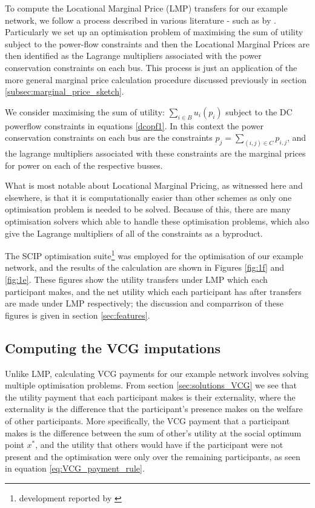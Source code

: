 To compute the Locational Marginal Price (LMP) transfers for our example network, we follow a process described in various literature - such as by \cite{lmp1,lmp2}.
Particularly we set up an optimisation problem of maximising the sum of utility subject to the power-flow constraints and then the Locational Marginal Prices are then identified as the Lagrange multipliers associated with the power conservation constraints on each bus.
This process is just an application of the more general marginal price calculation procedure discussed previously in section \ref{subsec:marginal_price_sketch}.

We consider maximising the sum of utility: $\sum_{i\in B} u_i(p_i)$ subject to the DC powerflow constraints in equations \ref{dcopf1}.
In this context the power conservation constraints on each bus are the constraints $p_j = \sum_{(i,j)\in C}p_{i,j}$, and the lagrange multipliers associated with these constraints are the marginal prices for power on each of the respective busses.

What is most notable about Locational Marginal Pricing, as witnessed here and elsewhere, is that it is computationally easier than other schemes as only one optimisation problem is needed to be solved.
Because of this, there are many optimisation solvers which able to handle these optimisation problems, which also give the Lagrange multipliers of all of the constraints as a byproduct.

The SCIP optimisation suite\footnote{development reported by \cite{MaherFischerGallyetal.2017}} was employed for the optimisation of our example network, and the results of the calculation are shown in Figures \ref{fig:1f} and \ref{fig:1e}.
These figures show the utility transfers under LMP which each participant makes, and the net utility which each participant has after transfers are made under LMP respectively; the discussion and comparrison of these figures is given in section \ref{sec:features}.

\subsection{Computing the VCG imputations}\label{subsec:VCG_compute1}

Unlike LMP, calculating VCG payments for our example network involves solving multiple optimisation problems.
From section \ref{sec:solutions_VCG} we see that the utility payment that each participant makes is their externality, where the externality is the difference that the participant's presence makes on the welfare of other participants.
More specifically, the VCG payment that a participant makes is the difference between the sum of other's utility at the social optimum point $x^*$, and the utility that others would have if the participant were not present and the optimisation were only over the remaining participants, as seen in equation \ref{eq:VCG_payment_rule}.

